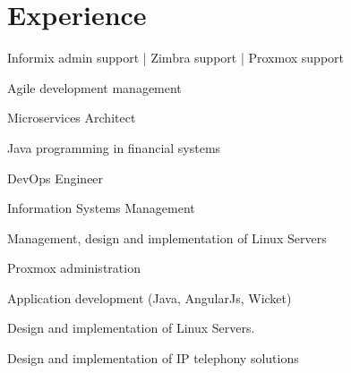 \documentclass[]{jorge-resume-openfont}
\begin{document}
\begin{minipage}[t]{0.63\textwidth} 


\section{Experience}

\vspace{\topsep} %
\begin{tightemize}
\item Informix admin support | Zimbra support | Proxmox support
\end{tightemize}    
\sectionsep

\begin{tightemize}
\item Agile development management 
\end{tightemize}    
\sectionsep


\begin{tightemize}
\item Microservices Architect
\item Java programming in financial systems
\item DevOps Engineer    
\end{tightemize}    
\sectionsep

\begin{tightemize}
\item Information Systems Management
\item Management, design and implementation of Linux Servers
\item Proxmox administration
\end{tightemize}    
\sectionsep

\begin{tightemize}
\item Application development (Java, AngularJs, Wicket)
\item Design and implementation of Linux Servers.
\item Design and implementation of IP telephony solutions
\end{tightemize}    
\sectionsep



\end{minipage}
\end{document}
